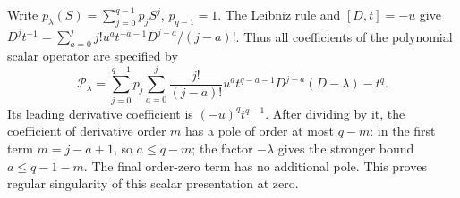 \documentclass[11pt]{article}
\begin{document}
Write $p_\lambda(S)=\sum_{j=0}^{q-1}p_jS^j$, $p_{q-1}=1$.
The Leibniz rule and $[D,t]=-u$ give
$D^jt^{-1}=\sum_{a=0}^j j!u^a t^{-a-1}D^{j-a}/(j-a)!$.
Thus all coefficients of the polynomial scalar operator are specified by
\begin{equation}\tag{MAR7}\label{mar:P}
 \mathscr P_\lambda=
 \sum_{j=0}^{q-1}p_j\sum_{a=0}^j
 \frac{j!}{(j-a)!}u^a t^{q-a-1}D^{j-a}(D-\lambda)-t^q.
\end{equation}
Its leading derivative coefficient is $(-u)^q t^{q-1}$.
After dividing by it, the coefficient of derivative order $m$ has
a pole of order at most $q-m$: in the first term $m=j-a+1$,
so $a\le q-m$; the factor $-\lambda$ gives the stronger bound
$a\le q-1-m$. The final order-zero term has no additional pole.
This proves regular singularity of this scalar presentation at zero.
\end{document}
